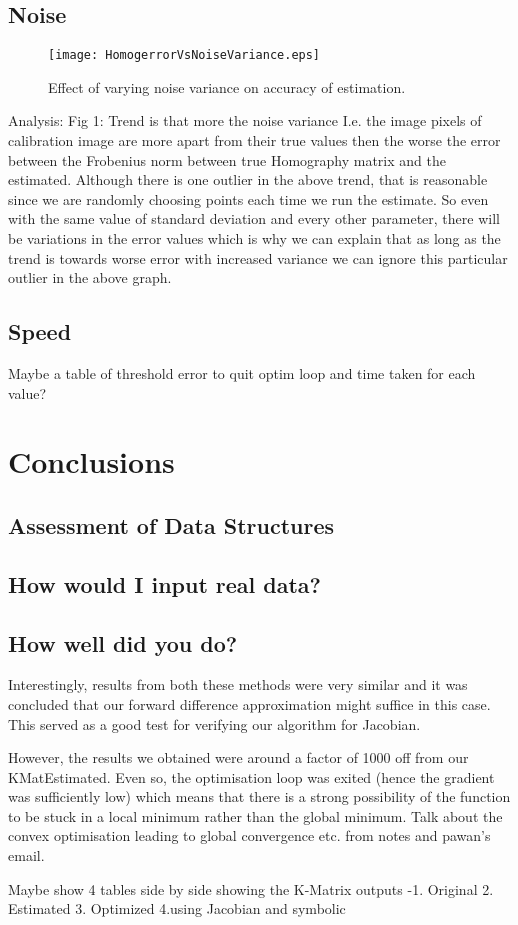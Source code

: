 \documentclass[titlepage]{article}
\begin{document}
\subsection{Noise}
\begin{wrapfigure}{r}{5.5cm}
\caption{Effect of varying noise variance on accuracy of estimation.}\label{wrap-fig:1}
\texttt{[image: HomogerrorVsNoiseVariance.eps]}
\end{wrapfigure} 
Analysis: Fig 1: Trend is that more the noise variance I.e. the image pixels of calibration image are more apart from their true values then the worse the error between the Frobenius norm between true Homography matrix and the estimated. Although there is one outlier in the above trend, that is reasonable since we are randomly choosing points each time we run the estimate. So even with the same value of standard deviation and every other parameter, there will be variations in the error values which is why we can explain that as long as the trend is towards worse error with increased variance we can ignore this particular outlier in the above graph.

\subsection{Speed}
Maybe a table of threshold error to quit optim loop and time taken for each value?



\section{Conclusions}
\subsection{Assessment of Data Structures}
\subsection{How would I input real data?}
\subsection{How well did you do?}
Interestingly, results from both these methods were very similar and it was concluded that our forward difference approximation might suffice in this case. This served as a good test for verifying our algorithm for Jacobian.


However, the results we obtained were around a factor of 1000 off from our KMatEstimated. Even so, the optimisation loop was exited (hence the gradient was sufficiently low) which means that there is a strong possibility of the function to be stuck in a local minimum rather than the global minimum. Talk about the convex optimisation leading to global convergence etc. from notes and pawan’s email.


Maybe show 4 tables side by side showing the K-Matrix outputs -1. Original 2. Estimated 3. Optimized 4.using Jacobian and symbolic
\end{document}
